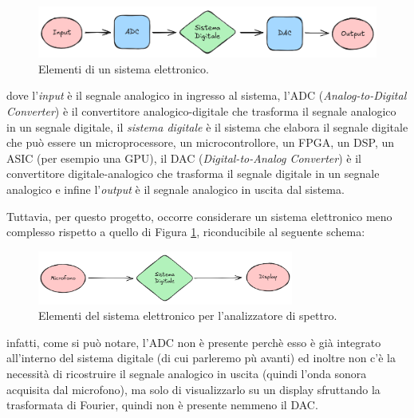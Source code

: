 \documentclass[a4paper,12pt]{report}  %
\begin{document}
\begin{figure}[h]
    \centering
    \includegraphics[width=1.0\textwidth]{imgs/electronics-system-elements.png}
    \caption{Elementi di un sistema elettronico.}
    \label{fig:system}
\end{figure}

dove l'\textit{input} è il segnale analogico in ingresso al sistema, l'ADC (\textit{Analog-to-Digital Converter}) è il convertitore analogico-digitale che trasforma il segnale analogico in un segnale digitale, il \textit{sistema digitale} è il sistema che elabora il segnale digitale che può essere un microprocessore, un microcontrollore, un FPGA, un DSP, un ASIC (per esempio una GPU), il DAC (\textit{Digital-to-Analog Converter}) è il convertitore digitale-analogico che trasforma il segnale digitale in un segnale analogico e infine l'\textit{output} è il segnale analogico in uscita dal sistema.

Tuttavia, per questo progetto, occorre considerare un sistema elettronico meno complesso rispetto a quello di Figura \ref{fig:system}, riconducibile al seguente schema:

\begin{figure}[h]
    \centering
    \includegraphics[width=0.75\textwidth]{imgs/electronics-system-elements-fft.png}
    \caption{Elementi del sistema elettronico per l'analizzatore di spettro.}
    \label{fig:easy_system}
\end{figure}

infatti, come si può notare, l'ADC non è presente perchè esso è già integrato all'interno del sistema digitale (di cui parleremo pù avanti) ed inoltre non c'è la necessità di ricostruire il segnale analogico in uscita (quindi l'onda sonora acquisita dal microfono), ma solo di visualizzarlo su un display sfruttando la trasformata di Fourier, quindi non è presente nemmeno il DAC.
\end{document}
